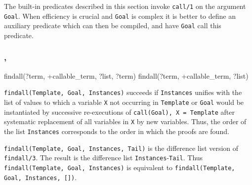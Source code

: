 The built-in predicates described in this section invoke \texttt{call/1}
 on the argument \texttt{Goal}. When efficiency is crucial
and \texttt{Goal} is complex it is better to define an auxiliary predicate
which can then be compiled, and have \texttt{Goal} call this predicate.

\subsubsection{, }

\begin{TemplatesOneCol}
findall(?term, +callable\_term, ?list, ?term)
findall(?term, +callable\_term, ?list)

\end{TemplatesOneCol}

\Description

\texttt{findall(Template, Goal, Instances)} succeeds if \texttt{Instances}
unifies with the list of values to which a variable \texttt{X} not occurring
in \texttt{Template} or \texttt{Goal} would be instantiated by successive
re-executions of \texttt{call(Goal), X = Template} after systematic
replacement of all variables in \texttt{X} by new variables. Thus, the order
of the list \texttt{Instances} corresponds to the order in which the proofs
are found.

\texttt{findall(Template, Goal, Instances, Tail)} is the difference list
version of \texttt{findall/3}. The result is the difference list
\texttt{Instances}-\texttt{Tail}. Thus \texttt{findall(Template, Goal,
  Instances)} is equivalent to \texttt{findall(Template, Goal, Instances,
  [])}.

\begin{PlErrors}






\end{PlErrors}

